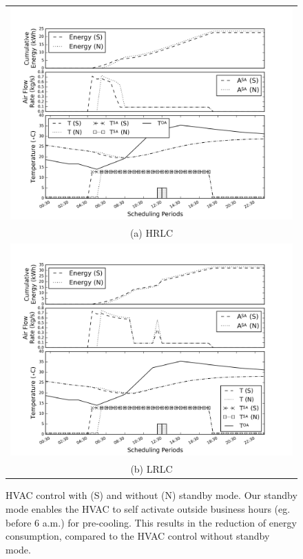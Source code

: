 \begin{figure}
\begin{tabular}{c}
  \includegraphics[width=0.9\linewidth]{figs/hrlc_opt_ws_ns_r0.png} \\
(a) HRLC \\[6pt]
  \includegraphics[width=0.9\linewidth]{figs/lrlc_opt_ws_ns_r0.png} \\
(b) LRLC \\[6pt]
\end{tabular}
\caption{HVAC control with (S) and without (N) standby mode. Our standby mode enables the HVAC to self activate outside business hours (eg. before 6 a.m.) for pre-cooling. This results in the reduction of energy consumption, compared to the HVAC control without standby mode.}
\label{fig:standby}
\end{figure}

